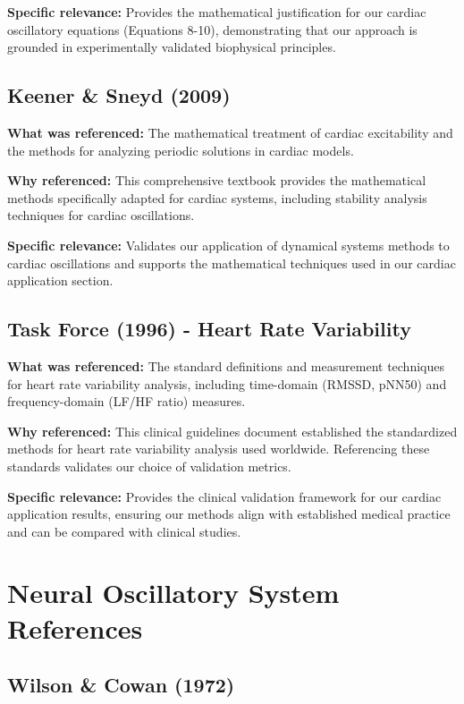 \documentclass{article}
\begin{document}
\textbf{Specific relevance:} Provides the mathematical justification for our cardiac oscillatory equations (Equations 8-10), demonstrating that our approach is grounded in experimentally validated biophysical principles.

\subsection{Keener \& Sneyd (2009)}

\textbf{What was referenced:} The mathematical treatment of cardiac excitability and the methods for analyzing periodic solutions in cardiac models.

\textbf{Why referenced:} This comprehensive textbook provides the mathematical methods specifically adapted for cardiac systems, including stability analysis techniques for cardiac oscillations.

\textbf{Specific relevance:} Validates our application of dynamical systems methods to cardiac oscillations and supports the mathematical techniques used in our cardiac application section.

\subsection{Task Force (1996) - Heart Rate Variability}

\textbf{What was referenced:} The standard definitions and measurement techniques for heart rate variability analysis, including time-domain (RMSSD, pNN50) and frequency-domain (LF/HF ratio) measures.

\textbf{Why referenced:} This clinical guidelines document established the standardized methods for heart rate variability analysis used worldwide. Referencing these standards validates our choice of validation metrics.

\textbf{Specific relevance:} Provides the clinical validation framework for our cardiac application results, ensuring our methods align with established medical practice and can be compared with clinical studies.

\section{Neural Oscillatory System References}

\subsection{Wilson \& Cowan (1972)}
\end{document}

